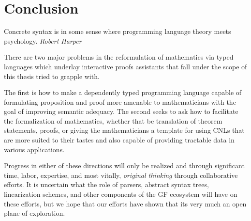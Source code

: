 \section{Conclusion}

\begin{displayquote}
Concrete syntax is in some sense where programming language theory meets
psychology. \emph{Robert Harper} 
\end{displayquote}



There are two major problems in the reformulation of mathematics via
typed languages which underlay interactive proofs assistants that fall under the
scope of this thesis tried to grapple with. 

The first is how to make a dependently typed programming language capable of
formulating proposition and proof more amenable to mathematicians with the goal
of improving semantic adequacy. The second seeks to ask how to facilitate the
formalization of mathematics, whether that be translation of theorem statements,
proofs, or giving the mathematicians a template for using CNLs that are more
suited to their tastes and also capable of providing tractable data in various
applications.

Progress in either of these directions will only be realized and through
significant time, labor, expertise, and most vitally, \emph{original thinking}
through collaborative efforts. It is uncertain what the role of parsers,
abstract syntax trees, linearization schemes, and other components of the GF
ecosystem will have on these efforts, but we hope that our efforts have shown
that its very much an open plane of exploration. 


